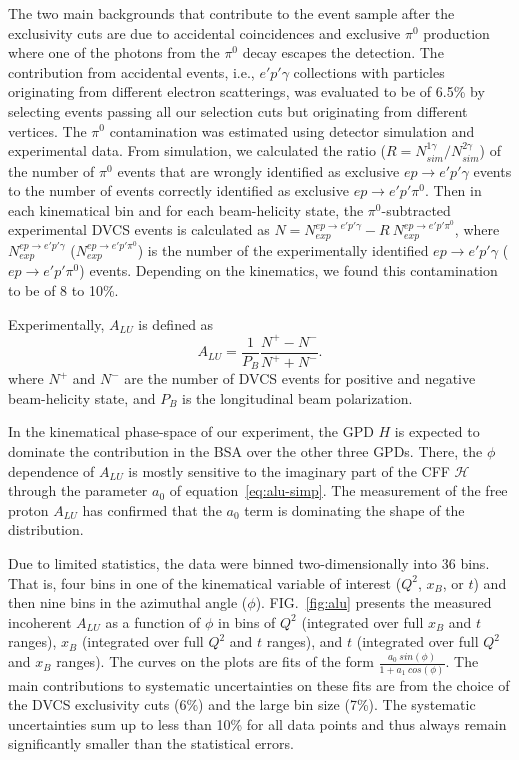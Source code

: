 \documentclass[twocolumn,nofootinbib,showpacs,prl,superscriptaddress,secnumarabic,amssymb,nobibnotes,aps,floatfix]{revtex4}
\begin{document}
The two main backgrounds that contribute to the event sample after the 
exclusivity cuts are due to accidental coincidences and exclusive $\pi^0$ 
production where one of the photons from the $\pi^0$ decay escapes the 
detection. The contribution from accidental events, i.e., $e'p'\gamma$ 
collections with particles originating from different electron scatterings, was 
evaluated to be of 6.5\% by selecting events passing all our selection cuts but 
originating from different vertices. The $\pi^0$ contamination was estimated 
using detector simulation and experimental data. From simulation, we calculated 
the ratio ($R = N^{1\gamma}_{sim}/N^{2\gamma}_{sim}$) of the number of $\pi^0$ 
events that are wrongly identified as exclusive $ep\rightarrow e'p'\gamma$ 
events to the number of events correctly identified as exclusive $ep\rightarrow 
e'p'\pi^0$.  Then in each kinematical bin and for each beam-helicity state, the 
$\pi^0$-subtracted experimental DVCS events is calculated as $N = 
N^{ep\rightarrow e'p'\gamma}_{exp}- R~N^{ep\rightarrow e'p'\pi^0}_{exp}$, where 
$N^{ep\rightarrow e'p'\gamma}_{exp}$ ($N^{ep\rightarrow e'p'\pi^0}_{exp}$) is 
the number of the experimentally identified $ep\rightarrow e'p'\gamma$ 
($ep\rightarrow e'p'\pi^0$) events. Depending on the kinematics, we found this 
contamination to be of 8 to 10\%. 


Experimentally, $A_{LU}$ is defined as
\begin{equation}
A_{LU} = \frac{1}{P_{B}} \frac{N^{+} - N^{-}}{N^{+} + N^{-} }.
\end{equation}
where $N^{+}$ and $N^{-}$ are the number of DVCS events for positive and negative 
beam-helicity state, and $P_{B}$ is the longitudinal beam polarization.  

In the kinematical phase-space of our experiment, the GPD $H$ is
expected to dominate the contribution in the BSA over the other three GPDs.  
There, the $\phi$ dependence of $A_{LU}$ is mostly sensitive to the  imaginary 
part of the CFF $\mathcal{H}$ through the parameter $a_0$ of 
equation~\ref{eq:alu-simp}. The measurement of the free proton $A_{LU}$ 
\cite{Girod:2007aa} has confirmed that the $a_0$ term is dominating the shape 
of the distribution. 

Due to limited statistics, the data were binned two-dimensionally into 36 bins.  
That is, four bins in one of the kinematical variable of interest ($Q^{2}$, 
$x_{B}$, or $t$) and then nine bins in the azimuthal angle ($\phi$).   
FIG.~\ref{fig:alu} presents the measured incoherent $A_{LU}$ as a function of 
$\phi$ in bins of $Q^{2}$ (integrated over full $x_{B}$ and $t$ ranges), 
$x_{B}$ (integrated over full $Q^{2}$ and $t$ ranges), and $t$ (integrated over 
full $Q^{2}$ and $x_{B}$ ranges). The curves on the plots are fits of the form 
$\frac{a_{0}~sin(\phi)}{1+ a_{1}~cos(\phi)}$.  The main contributions to 
systematic uncertainties on these fits are from the choice of the DVCS 
exclusivity cuts (6\%) and the large bin size (7\%). The systematic 
uncertainties sum up to less than 10\% for all data points and thus always 
remain significantly smaller than the statistical errors.
\end{document}
